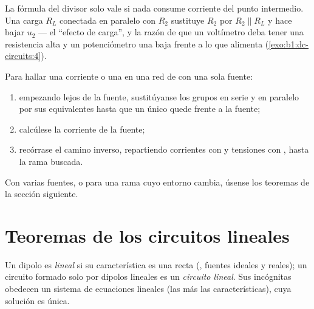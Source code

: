 \begin{remark}\label{rem:b1:dc-circuits:loading}
La fórmula del divisor solo vale si nada consume corriente del punto
intermedio. Una carga $R_L$ conectada en paralelo con $R_2$ sustituye
$R_2$ por $R_2
\parallel R_L$ y hace bajar $u_2$ --- el ``efecto de carga'', y la razón
de que un voltímetro deba tener una resistencia alta y un potenciómetro
una baja frente a lo que alimenta (\cref{exo:b1:dc-circuits:4}).
\end{remark}

\begin{method}\label{met:b1:dc-circuits:reduce}
Para hallar una corriente o una  en una red de  con una
sola fuente:
\begin{enumerate}
  \item empezando lejos de la fuente, sustitúyanse los grupos en serie y
        en paralelo por sus equivalentes hasta que un único  quede
        frente a la fuente;
  \item calcúlese la corriente de la fuente;
  \item recórrase el camino inverso, repartiendo corrientes con  y tensiones con , hasta la rama
        buscada.
\end{enumerate}
Con varias fuentes, o para una rama cuyo entorno cambia, úsense los
teoremas de la sección siguiente.
\end{method}

\section{Teoremas de los circuitos lineales}

\begin{definition}\label{def:b1:dc-circuits:linear}
Un dipolo es \emph{lineal} si su característica es una recta (,
fuentes ideales y reales); un circuito formado solo por dipolos lineales
es un \emph{circuito lineal}. Sus incógnitas obedecen un sistema de
ecuaciones lineales (las  más las características), cuya
solución es única.
\end{definition}

